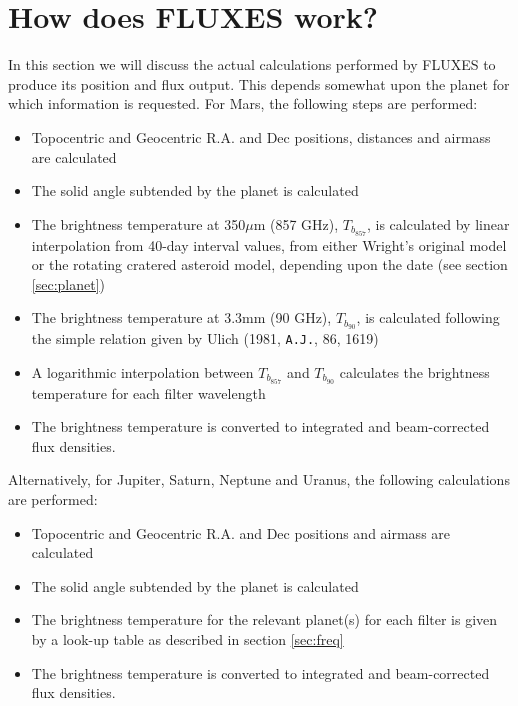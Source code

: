 \documentclass[11pt,twoside]{article}
\newcommand{\xlabel}[1]{}
\renewcommand{\_}{\texttt{\symbol{95}}}
\begin{document}
\section{How does FLUXES work?}
\xlabel{howfluxesworks}
\label{sec:howfluxesworks}

In this section we will discuss the actual calculations performed by FLUXES to produce its position and flux output.  This depends somewhat upon the planet for which information is requested.  For Mars, the following steps are performed:

\begin{itemize}
\item{Topocentric and Geocentric R.A. and Dec positions, distances and airmass are calculated}
\item{The solid angle subtended by the planet is calculated}
\item{The brightness temperature at 350$\mu$m (857 GHz), $T_{b_{857}}$,  is calculated by linear interpolation from 40-day interval values, from either Wright's original model or the rotating cratered asteroid model, depending upon the date (see section \ref{sec:planet})}
\item{The brightness temperature at 3.3mm (90 GHz), $T_{b_{90}}$, is calculated following the simple relation given by Ulich (1981, {\tt{A.J.}}, 86, 1619)}
\item{A logarithmic interpolation between $T_{b_{857}}$ and $T_{b_{90}}$ calculates the brightness temperature for each filter wavelength}
\item{The brightness temperature is converted to integrated and beam-corrected flux densities.}
\end{itemize}

Alternatively, for Jupiter, Saturn, Neptune and Uranus, the following calculations are performed:

\begin{itemize}
\item{Topocentric and Geocentric R.A. and Dec positions and airmass are calculated}
\item{The solid angle subtended by the planet is calculated}
\item{The brightness temperature for the relevant planet(s) for each filter is given by a look-up table as described in section \ref{sec:freq}}
\item{The brightness temperature is converted to integrated and beam-corrected flux densities.}
\end{itemize}
\end{document}
